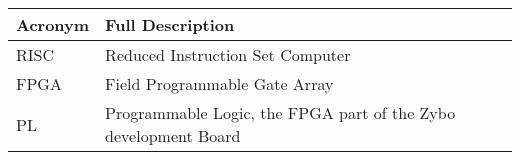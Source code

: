 \begin{table}[H]
	\begin{tabularx}{\textwidth}{| a | x |}
		\hline
		\textbf{Acronym} & \textbf{Full Description}                                       \\
		\hline
		RISC             & Reduced Instruction Set Computer                                \\
		FPGA             & Field Programmable Gate Array                                   \\
		PL               & Programmable Logic, the FPGA part of the Zybo development Board \\
		\hline
	\end{tabularx}
\end{table}

